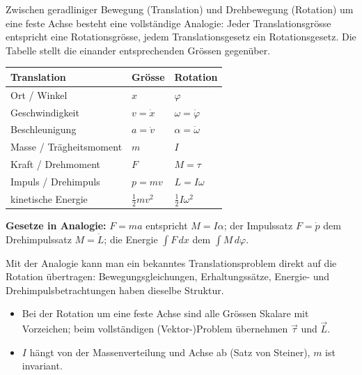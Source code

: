 
Zwischen geradliniger Bewegung (Translation) und Drehbewegung (Rotation) um
eine feste Achse besteht eine vollständige Analogie: Jeder Translationsgrösse
entspricht eine Rotationsgrösse, jedem Translationsgesetz ein
Rotationsgesetz. Die Tabelle stellt die einander entsprechenden Grössen
gegenüber.

\begin{werkzeugkasten}
\begin{center}
\renewcommand{\arraystretch}{1.35}
\begin{tabular}{lll}
\toprule
\textbf{Translation} & \textbf{Grösse} & \textbf{Rotation}\\
\midrule
Ort / Winkel & $x$ & $\varphi$ \\
Geschwindigkeit & $v=\dot x$ & $\omega=\dot\varphi$ \\
Beschleunigung & $a=\dot v$ & $\alpha=\dot\omega$ \\
Masse / Trägheitsmoment & $m$ & $I$ \\
Kraft / Drehmoment & $F$ & $M=\tau$ \\
Impuls / Drehimpuls & $p=mv$ & $L=I\omega$ \\
kinetische Energie & $\frac12 mv^2$ & $\frac12 I\omega^2$ \\
\bottomrule
\end{tabular}
\end{center}

\textbf{Gesetze in Analogie:} $F=ma$ entspricht $M=I\alpha$; der Impulssatz
$F=\dot p$ dem Drehimpulssatz $M=\dot L$; die Energie
$\int F\,dx$ dem $\int M\,d\varphi$.
\end{werkzeugkasten}

\begin{werkzeugkasten}[Nutzen]
Mit der Analogie kann man ein bekanntes Translationsproblem direkt auf die
Rotation übertragen: Bewegungsgleichungen, Erhaltungssätze, Energie- und
Drehimpulsbetrachtungen haben dieselbe Struktur.
\end{werkzeugkasten}

\begin{achtung}[Hinweis]
\begin{itemize}
  \item Bei der Rotation um eine feste Achse sind alle Grössen Skalare mit
       Vorzeichen; beim vollständigen (Vektor-)Problem übernehmen $\vec\tau$
       und $\vec L$.
  \item $I$ hängt von der Massenverteilung und Achse ab (Satz von Steiner),
       $m$ ist invariant.
\end{itemize}
\end{achtung}
